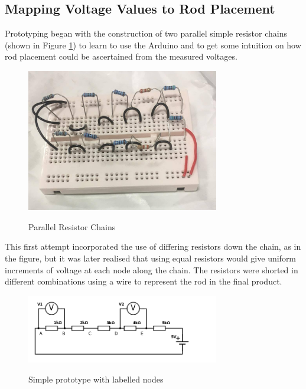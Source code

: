 \subsection{Mapping Voltage Values to Rod Placement}
Prototyping began with the construction of two parallel simple resistor chains (shown in Figure \ref{fig:simple_resistor}) to learn to use the Arduino and to get some intuition on how rod placement could be ascertained from the measured voltages. 

\begin{figure}[H]
	\begin{center}
	\includegraphics[width=0.75\textwidth]{simple_resistor_chain.jpg}\\
  	\caption{Parallel Resistor Chains}
    \label{fig:simple_resistor}
    \end{center}
\end{figure}

This first attempt incorporated the use of differing resistors down the chain, as in the figure, but it was later realised that using equal resistors would give uniform increments of voltage at each node along the chain. The resistors were shorted in different combinations using a wire to represent the rod in the final product.\\

\begin{figure}[H]
	\begin{center}
	\includegraphics[width=0.75\textwidth]{5r.png}\\ 
  	\caption{Simple prototype with labelled nodes}
    \label{fig:5r}
    \end{center}
\end{figure}

